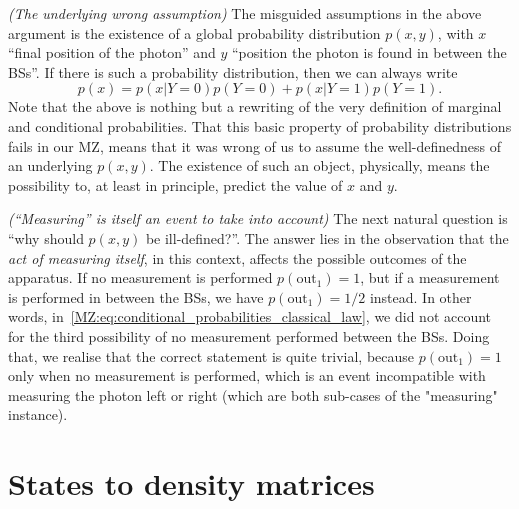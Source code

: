 \documentclass[12pt]{report}
\newcommand{\heading}[1]{{\color{Mahogany}\emph{(#1)}}}
\begin{document}
\heading{The underlying wrong assumption}
The misguided assumptions in the above argument is the existence of a global probability distribution $p(x,y)$, with $x$ ``final position of the photon'' and $y$ ``position the photon is found in between the BSs''.
If there is such a probability distribution, then we can always write
\begin{equation}
	p(x) = p(x|Y=0) p(Y=0) + p(x|Y=1) p(Y=1).
\end{equation}
Note that the above is nothing but a rewriting of the very definition of marginal and conditional probabilities.
That this basic property of probability distributions fails in our MZ, means that it was wrong of us to assume the well-definedness of an underlying $p(x,y)$.
The existence of such an object, physically, means the possibility to, at least in principle, predict the value of $x$ and $y$.

\heading{``Measuring'' is itself an event to take into account}
The next natural question is ``why should $p(x,y)$ be ill-defined?''.
The answer lies in the observation that the \emph{act of measuring itself}, in this context, affects the possible outcomes of the apparatus. If no measurement is performed $p(\text{out}_1)=1$, but if a measurement is performed in between the BSs, we have $p(\text{out}_1)=1/2$ instead.
In other words, in~\cref{MZ:eq:conditional_probabilities_classical_law}, we did not account for the third possibility of no measurement performed between the BSs.
Doing that, we realise that the correct statement is quite trivial, because $p(\text{out}_1)=1$ only when no measurement is performed, which is an event incompatible with measuring the photon left or right (which are both sub-cases of the "measuring" instance).


\section{States to density matrices}
\end{document}
